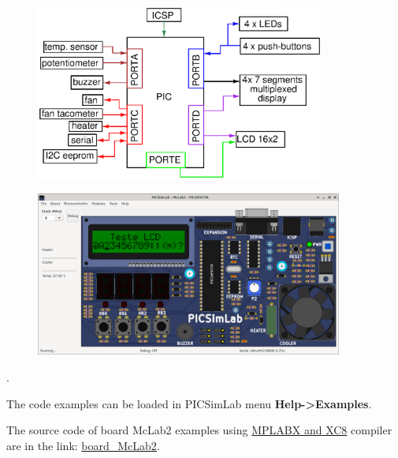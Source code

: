 \begin{figure}[H]
\center
\includegraphics[width=0.85\textwidth]{img/blocks_p3.eps} 
\end{figure} 


\begin{figure}[H]
\center
\includegraphics[width=0.9\textwidth]{img/picsimlab3.png} 
\end{figure} 

.\vspace{0.5cm}

The code examples can be loaded in PICSimLab menu \textbf{Help->Examples}.

The source code of board McLab2 examples using \href{http://www.microchip.com/mplabx}{MPLABX and XC8} 
compiler are in the link: \href{https://lcgamboa.github.io/picsimlab_examples/examples/examples_index.html\#board_McLab2}{board\_McLab2}.




